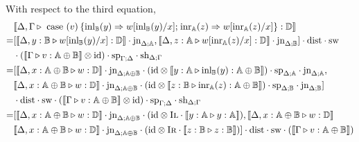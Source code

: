 With respect to the third equation,
\begin{equation*}
  \begin{split}
  & \llbracket \Delta,\Gamma \triangleright \text{ case }(v) \hspace{2pt} \{\text{inl}_{\mathbb{B}} (y) \Rightarrow w [ \text{inl}_{\mathbb{B}}(y)/x] ; \hspace{1pt} \text{inr}_{\mathbb{A}} (z) \Rightarrow w [ \text{inr}_{\mathbb{A}}(z)/x]\}: \mathbb{D}\rrbracket \\
  =& [\llbracket\Delta, y: \mathbb{B} \triangleright w [ \text{inl}_{\mathbb{B}}(y)/x]: \mathbb{D}\rrbracket \cdot \text{jn}_{\Delta;\mathbb{A}} ,\llbracket\Delta, z: \mathbb{A} \triangleright w [ \text{inr}_{\mathbb{A}}(z)/x]: \mathbb{D}\rrbracket \cdot \text{jn}_{\Delta;\mathbb{B}} ] \cdot \text{dist} \cdot \text{sw}  \\
  & \cdot (\llbracket\Gamma \triangleright v: \mathbb{A} \oplus \mathbb{B}\rrbracket \otimes \text{id}) \cdot  \text{sp}_{\Gamma;\Delta} \cdot \text{sh}_{\Delta;\Gamma} \\
  = & [\llbracket\Delta, x: \mathbb{A} \oplus \mathbb{B} \triangleright w: \mathbb{D}\rrbracket \cdot \text{jn}_{\Delta;\mathbb{A} \oplus \mathbb{B}} \cdot (\text{id} \otimes \llbracket y : \mathbb{A} \triangleright \text{inl}_{\mathbb{B}}(y) :\mathbb{A} \oplus \mathbb{B}  \rrbracket) \cdot \text{sp}_{\Delta;\mathbb{A}} \cdot \text{jn}_{\Delta;\mathbb{A}} , \\
  & \llbracket \Delta,x: \mathbb{A} \oplus \mathbb{B} \triangleright w: \mathbb{D}\rrbracket \cdot \text{jn}_{\Delta;\mathbb{A} \oplus \mathbb{B}} \cdot (\text{id} \otimes \llbracket z:\mathbb{B}  \triangleright \text{inr}_{\mathbb{A}}(z) :\mathbb{A} \oplus \mathbb{B}  \rrbracket) \cdot \text{sp}_{\Delta;\mathbb{B}} \cdot \text{jn}_{\Delta;\mathbb{B}} ]       \\
  & \cdot \text{dist} \cdot \text{sw} \cdot (\llbracket\Gamma \triangleright v: \mathbb{A} \oplus \mathbb{B}\rrbracket \otimes \text{id}) \cdot  \text{sp}_{\Gamma;\Delta} \cdot \text{sh}_{\Delta;\Gamma} \\
  = & [\llbracket\Delta, x: \mathbb{A} \oplus \mathbb{B} \triangleright w: \mathbb{D}\rrbracket \cdot \text{jn}_{\Delta;\mathbb{A} \oplus \mathbb{B}} \cdot (\text{id} \otimes \textsc{Il} \cdot \llbracket y : \mathbb{A}  \triangleright y :\mathbb{A}   \rrbracket), \llbracket \Delta,x: \mathbb{A} \oplus \mathbb{B} \triangleright w: \mathbb{D}\rrbracket \\
  & \llbracket \Delta,x: \mathbb{A} \oplus \mathbb{B} \triangleright w: \mathbb{D}\rrbracket \cdot \text{jn}_{\Delta;\mathbb{A} \oplus \mathbb{B}} \cdot (\text{id} \otimes \textsc{Ir} \cdot \llbracket z:\mathbb{B}  \triangleright z : \mathbb{B}  \rrbracket)] \cdot \text{dist} \cdot \text{sw}   \cdot (\llbracket\Gamma \triangleright v: \mathbb{A} \oplus \mathbb{B}\rrbracket )   \\

\end{split}
\end{equation*}
